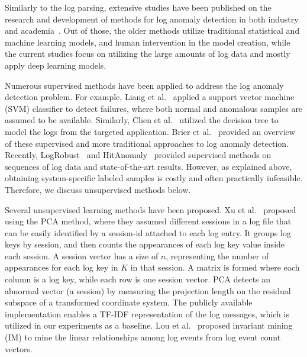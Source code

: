 Similarly to the log parsing, extensive studies have been published on the research and development of methods for log anomaly detection in both industry and academia~\cite{bodik2010fingerprinting, jakublogs,chen2004failure,farshchi2015experience,fu2009execution, hamooni2016logmine, liang2007failure, du2017deeplog, xu2009detecting,  zhang2019robust, meng2019loganomaly, nedelkoski2020selfsupervised,xu2014weber}. Out of those, the older methods utilize traditional statistical and machine learning models, and human intervention in the model creation, while the current studies focus on utilizing the large amounts of log data and mostly apply deep learning models.

Numerous supervised methods have been applied to address the log anomaly detection problem. For example, Liang et al.~\cite{liang2007failure} applied a support vector machine (SVM) classifier to detect failures, where both normal and anomalous samples are assumed to be available. Similarly, Chen et al.~\cite{chen2004failure} utilized the decision tree to model the logs from the targeted application. 
Brier et al.~\cite{breier2015anomaly} provided an overview of these supervised and more traditional approaches to log anomaly detection. Recently, LogRobust~\cite{zhang2019robust} and HitAnomaly~\cite{huang2020hitanomaly} provided supervised methods on sequences of log data and state-of-the-art results. However, as explained above, obtaining system-specific labeled samples is costly and often practically infeasible. Therefore, we discuss unsupervised methods below.

Several unsupervised learning methods have been proposed. Xu et al.~\cite{xu2009detecting} proposed using the PCA method, where they assumed different sessions in a log file that can be easily identified by a session-id attached to each log entry. It groups log keys by session, and then counts the appearances of each log key value inside each session. A session vector has a size of $n$, representing the number of appearances for each log key in $K$ in that session. A matrix is formed where each column is a log key, while each row is one session vector. PCA detects an abnormal vector (a session) by measuring the projection length on the residual subspace of a transformed coordinate system. The publicly available implementation enables a TF-IDF representation of the log messages, which is utilized in our experiments as a baseline. Lou et al.~\cite{lou2010mining} proposed invariant mining (IM) to mine the linear relationships among log events from log event count vectors. 

